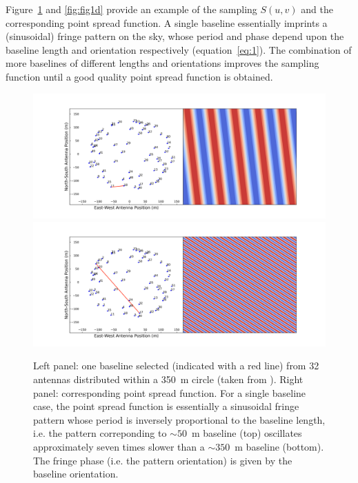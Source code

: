 Figure~\ref{fig:fig1c} and \ref{fig:fig1d} provide an example of the sampling $S(u,v)$ and the corresponding point spread function. A single baseline essentially imprints a (sinusoidal) fringe pattern on the sky, whose period and phase depend upon the baseline length and orientation respectively (equation~\ref{eq:1}). The combination of more baselines of different lengths and orientations improves the sampling function until a good quality point spread function is obtained.
%
\begin{figure}[]
\begin{center}
\includegraphics[width=1.\textwidth]{Bernardi/fringe_bl_11_18}
\includegraphics[width=1.\textwidth]{Bernardi/fringe_bl_17_15}
\end{center}
\caption{Left panel: one baseline selected (indicated with a red line) from 32 antennas distributed within a 350~m circle (taken from \cite{jacobs11}). Right panel: corresponding point spread function. For a single baseline case, the point spread function is essentially a sinusoidal fringe pattern whose period is inversely proportional to the baseline length, i.e. the pattern correponding to $\sim 50$~m baseline (top) oscillates approximately seven times slower than a $\sim 350$~m baseline (bottom). The fringe phase (i.e. the pattern orientation) is given by the baseline orientation.}
\label{fig:fig1c}
\end{figure}
%
